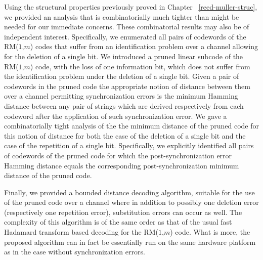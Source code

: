 Using the structural properties previously proved in Chapter
~\ref{reed-muller-struc}, we provided an analysis that is
combinatorially much tighter than might be needed for our immediate
concerns. These combinatorial results may also be of independent
interest. Specifically, we enumerated all pairs of codewords of the
RM($1$,$m$) codes that suffer from an identification problem over a
channel allowing for the deletion of a single bit. We introduced a
pruned linear subcode of the RM($1$,$m$) code, with the loss of one
information bit, which does not suffer from the identification
problem under the deletion of a single bit. Given a pair of
codewords in the pruned code the appropriate notion of distance
between them over a channel permitting synchronization errors is the
minimum Hamming distance between any pair of strings which are
derived respectively from each codeword after the application of
such synchronization error. We gave a combinatorially tight analysis
of the the minimum distance of the pruned code for this notion of
distance for both the case of the deletion of a single bit and the
case of the repetition of a single bit. Specifically, we explicitly
identified all pairs of codewords of the pruned code for which the
post-synchronization error Hamming distance equals the corresponding
post-synchronization minimum distance of the pruned code.

Finally, we provided a bounded distance decoding algorithm,
suitable for the use of the pruned code over a channel where in
addition to possibly one deletion error (respectively one
repetition error), substitution errors can occur as well. The
complexity of this algorithm is of the same order as that of the
usual fast Hadamard transform based decoding for the RM($1$,$m$)
code. What is more, the proposed algorithm can in fact be
essentially run on the same hardware platform as in the case
without synchronization errors.
